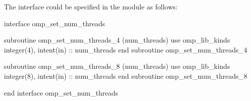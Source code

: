 The  interface could be specified in the  module
as follows:

\begin{ompfSubroutine}
interface omp_set_num_threads

  subroutine omp_set_num_threads_4 (num_threads)
    use omp_lib_kinds
    integer(4), intent(in) :: num_threads
  end subroutine omp_set_num_threads_4

  subroutine omp_set_num_threads_8 (num_threads)
    use omp_lib_kinds
    integer(8), intent(in) :: num_threads
  end subroutine omp_set_num_threads_8

end interface omp_set_num_threads
\end{ompfSubroutine}


